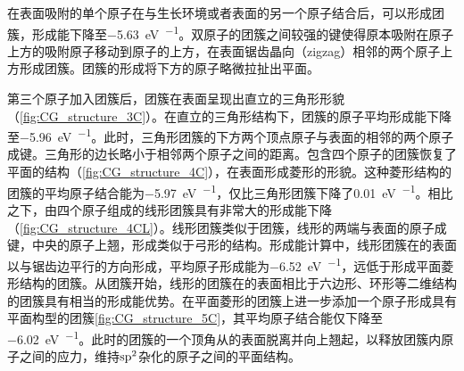     在表面吸附的单个原子在与生长环境或者表面的另一个原子结合后，可以形成团簇，形成能下降至\SI{-5.63}{\electronvolt\per\atom}。双原子的团簇之间较强的键使得原本吸附在原子上方的吸附原子移动到原子的上方，在表面锯齿晶向（zigzag）相邻的两个原子上方形成团簇。团簇的形成将下方的原子略微拉扯出平面。


    第三个原子加入团簇后，团簇在表面呈现出直立的三角形形貌（\ref{fig:CG_structure_3C}）。在直立的三角形结构下，团簇的原子平均形成能下降至\SI{-5.96}{\electronvolt\per\atom}。此时，三角形团簇的下方两个顶点原子与表面的相邻的两个原子成键。三角形的边长略小于相邻两个原子之间的距离。包含四个原子的团簇恢复了平面的结构（\ref{fig:CG_structure_4C}），在表面形成菱形的形貌。这种菱形结构的团簇的平均原子结合能为\SI{-5.97}{\electronvolt\per\atom}，仅比三角形团簇下降了\SI{0.01}{\electronvolt\per\atom}。相比之下，由四个原子组成的线形团簇具有非常大的形成能下降（\ref{fig:CG_structure_4CL}）。线形团簇类似于团簇，线形的两端与表面的原子成键，中央的原子上翘，形成类似于弓形的结构。形成能计算中，线形团簇在的表面以与锯齿边平行的方向形成，平均原子形成能为\SI{-6.52}{\electronvolt\per\atom}，远低于形成平面菱形结构的团簇。从团簇开始，线形的团簇在的表面相比于六边形、环形等二维结构的团簇具有相当的形成能优势。在平面菱形的团簇上进一步添加一个原子形成具有平面构型的团簇\ref{fig:CG_structure_5C}，其平均原子结合能仅下降至\SI{-6.02}{\electronvolt\per\atom}。此时的团簇的一个顶角从的表面脱离并向上翘起，以释放团簇内原子之间的应力，维持$\rm sp^2$杂化的原子之间的平面结构。

